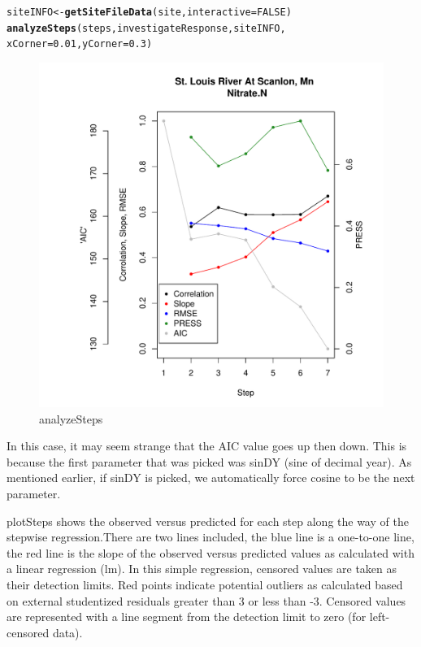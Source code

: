 \documentclass[a4paper,11pt]{article}\usepackage[]{graphicx}\usepackage[]{color}
\makeatletter
\def\maxwidth{ %
  \ifdim\Gin@nat@width>\linewidth
    \linewidth
  \else
    \Gin@nat@width
  \fi
}
\newcommand{\hlnum}[1]{\textcolor[rgb]{0.686,0.059,0.569}{#1}}%
\newcommand{\hlstd}[1]{\textcolor[rgb]{0.345,0.345,0.345}{#1}}%
\newcommand{\hlkwb}[1]{\textcolor[rgb]{0.69,0.353,0.396}{#1}}%
\newcommand{\hlkwc}[1]{\textcolor[rgb]{0.333,0.667,0.333}{#1}}%
\newcommand{\hlkwd}[1]{\textcolor[rgb]{0.737,0.353,0.396}{\textbf{#1}}}%
\newenvironment{kframe}{%
 \def\at@end@of@kframe{}%
 \ifinner\ifhmode%
  \def\at@end@of@kframe{\end{minipage}}%
  \begin{minipage}{\columnwidth}%
 \fi\fi%
 \def\FrameCommand##1{\hskip\@totalleftmargin \hskip-\fboxsep
 \colorbox{shadecolor}{##1}\hskip-\fboxsep
     \hskip-\linewidth \hskip-\@totalleftmargin \hskip\columnwidth}%
 \MakeFramed {\advance\hsize-\width
   \@totalleftmargin\z@ \linewidth\hsize
   \@setminipage}}%
 {\par\unskip\endMakeFramed%
 \at@end@of@kframe}
\newenvironment{knitrout}{}{} %
\makeatother
\begin{document}
\begin{knitrout}
\color{fgcolor}\begin{kframe}
\begin{alltt}
\hlstd{siteINFO} \hlkwb{<-} \hlkwd{getSiteFileData}\hlstd{(site,} \hlkwc{interactive}\hlstd{=}\hlnum{FALSE}\hlstd{)}
\hlkwd{analyzeSteps}\hlstd{(steps, investigateResponse,siteINFO,}
             \hlkwc{xCorner}\hlstd{=}\hlnum{0.01}\hlstd{,}\hlkwc{yCorner}\hlstd{=}\hlnum{0.3}\hlstd{)}
\end{alltt}
\end{kframe}\begin{figure}[]

\includegraphics[width=\maxwidth]{figure/analyzeSteps} \caption[analyzeSteps]{analyzeSteps\label{fig:analyzeSteps}}
\end{figure}


\end{knitrout}


In this case, it may seem strange that the AIC value goes up then down. This is because the first parameter that was picked was sinDY (sine of decimal year). As mentioned earlier, if sinDY is picked, we automatically force cosine to be the next parameter. 

\FloatBarrier

plotSteps shows the observed versus predicted for each step along the way of the stepwise regression.There are two lines included, the blue line is a one-to-one line, the red line is the slope of the observed versus predicted values as calculated with a linear regression (lm). In this simple regression, censored values are taken as their detection limits. Red points indicate potential outliers as calculated based on external studentized residuals greater than 3 or less than -3. Censored values are represented with a line segment from the detection limit to zero (for left-censored data).
\end{document}
